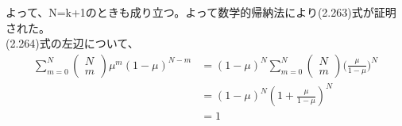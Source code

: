 \documentclass{bxjsarticle}
\begin{document}
よって、N=k+1のときも成り立つ。よって数学的帰納法により(2.263)式が証明された。\\
(2.264)式の左辺について、
\begin{align*}
\sum_{m=0}^N{\left(\begin{array}{ll} N \\ m \end{array} \right)\mu^m (1-\mu)^{N-m}} &= (1-\mu)^N \sum_{m=0}^N{\left(\begin{array}{ll} N \\ m \end{array} \right)(\frac{\mu}{1-\mu}})^N \\
                　&= (1-\mu)^N (1+\frac{\mu}{1-\mu})^N \\
                　&= 1
\end{align*}
\end{document}
